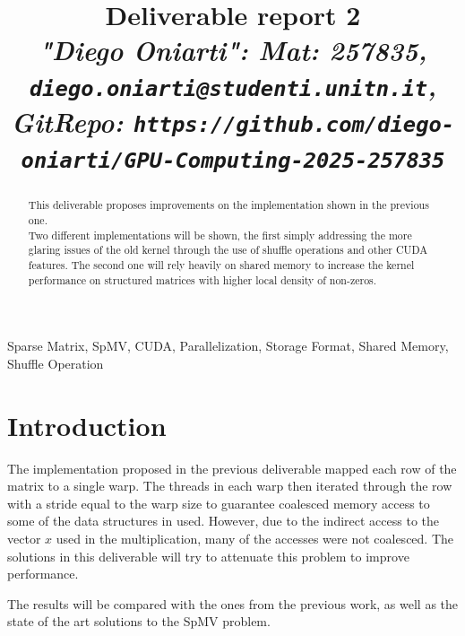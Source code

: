 \documentclass[conference]{IEEEtran}
\begin{document}
\author{}
\title{Deliverable report 2\\
\footnotesize \textit{"Diego Oniarti": Mat: 257835, \texttt{diego.oniarti@studenti.unitn.it}, GitRepo: \texttt{https://github.com/diego-oniarti/GPU-Computing-2025-257835}}}

\maketitle

\begin{abstract}
% 
    This deliverable proposes improvements on the implementation shown in the previous one.\\
    Two different implementations will be shown, the first simply addressing the more glaring issues of the old kernel through the use of shuffle operations and other CUDA features. The second one will rely heavily on shared memory to increase the kernel performance on structured matrices with higher local density of non-zeros.
\end{abstract}

\begin{IEEEkeywords}
Sparse Matrix, SpMV, CUDA, Parallelization, Storage Format, Shared Memory, Shuffle Operation
\end{IEEEkeywords}

\section{Introduction}
The implementation proposed in the previous deliverable mapped each row of the matrix to a single warp. The threads in each warp then iterated through the row with a stride equal to the warp size to guarantee coalesced memory access to some of the data structures in used. However, due to the indirect access to the vector $x$ used in the multiplication, many of the accesses were not coalesced. The solutions in this deliverable will try to attenuate this problem to improve performance.

The results will be compared with the ones from the previous work, as well as the state of the art solutions to the SpMV problem.
\end{document}
